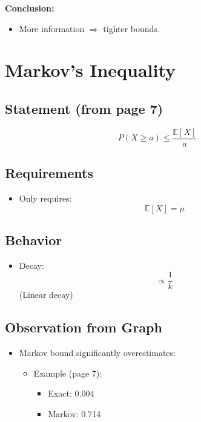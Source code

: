 \documentclass[11pt]{article}
\begin{document}
\textbf{Conclusion:}

\begin{itemize}
\item More information $\Rightarrow$ tighter bounds.
\end{itemize}

\section{Markov's Inequality}

\subsection{Statement (from page 7)}

\[
P(X \ge a) \le \frac{\mathbb{E}[X]}{a}
\]

\subsection{Requirements}

\begin{itemize}
\item Only requires:
\[
\mathbb{E}[X] = \mu
\]
\end{itemize}

\subsection{Behavior}

\begin{itemize}
\item Decay:
\[
\propto \frac{1}{k}
\]
(Linear decay)
\end{itemize}

\subsection{Observation from Graph}

\begin{itemize}
\item Markov bound significantly overestimates:
\begin{itemize}
\item Example (page 7):
\begin{itemize}
\item Exact: 0.004
\item Markov: 0.714
\end{itemize}
\end{itemize}
\end{itemize}
\end{document}
